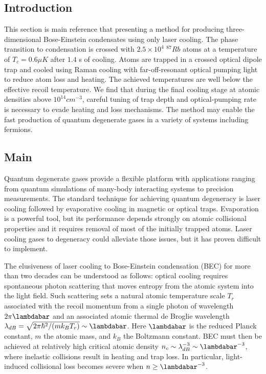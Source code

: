 \documentclass{article}
\begin{document}
\subsection{Introduction}
This section is main reference that presenting a method for producing three-dimensional Bose-Einstein condensates using only laser cooling. The phase transition to condensation is crossed with $2.5 \times 10^4$ $^{87}Rb$ atoms at a temperature of $T_c = 0.6 \mu K$ after $1.4$ s of cooling. Atoms are trapped in a crossed optical dipole trap and cooled using Raman cooling with far-off-resonant optical pumping light to reduce atom loss and heating. The achieved temperatures are well below the effective recoil temperature. We find that during the final cooling stage at atomic densities above $10^{14} cm^{-3}$, careful tuning of trap depth and optical-pumping rate is necessary to evade heating and loss mechanisms. The method may enable the fast production of quantum degenerate gases in a variety of systems including fermions.

\subsection{Main}
Quantum degenerate gases provide a flexible platform with applications ranging from quantum simulations of many-body interacting systems to precision measurements. The standard technique for achieving quantum degeneracy is laser cooling followed by evaporative cooling in magnetic  or optical traps. Evaporation is a powerful tool, but its performance depends strongly on atomic collisional properties and it requires removal of most of the initially trapped atoms. Laser cooling gases to degeneracy could alleviate those issues, but it has proven difficult to implement.

The elusiveness of laser cooling to Bose-Einstein condensation (BEC) for more than two decades can be understood as follows: optical cooling requires spontaneous photon scattering that moves entropy from the atomic system into the light field. Such scattering sets a natural atomic temperature scale $T_r$ associated with the recoil momentum from a single photon of wavelength $2 \pi \lambdabar$ and an associated atomic thermal de Broglie wavelength $\lambda_{dB} = \sqrt{2 \pi \hbar^2 / (m k_B T_r)} \sim \lambdabar$. Here $\lambdabar$ is the reduced Planck constant, $m$ the atomic mass, and $k_B$ the Boltzmann constant. BEC must then be achieved at relatively high critical atomic density $n_c \sim \lambda^{-3}_{dB} \sim \lambdabar^{-3}$, where inelastic collisions result in heating and trap loss. In particular, light-induced collisional loss becomes severe when $n \geq \lambdabar^{-3}$.
\end{document}
